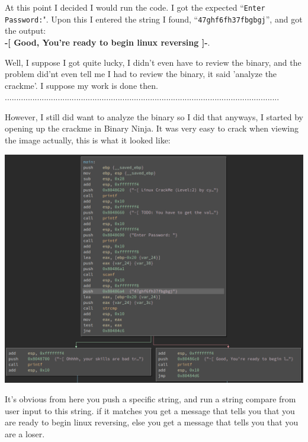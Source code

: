 \documentclass[12pt]{article}
\begin{document}
At this point I decided I would run the code. I got the expected ``\texttt{Enter Password:}". Upon this I entered the string I found,
``\texttt{47ghf6fh37fbgbgj}'', and got the output: \\ 
\textbf{-[ Good, You're ready to begin linux reversing ]-}.

Well, I suppose I got quite lucky, I didn't even have to review the binary, and the problem did'nt even tell me I had to review the
binary, it said 'analyze the crackme'. I suppose my work is done then. \\
.......................................................................................................................

However, I still did want to analyze the binary so I did that anyways, I started by opening up the crackme in Binary Ninja. It was very easy
to crack when viewing the image actually, this is what it looked like:

\begin{center}
	\includegraphics[scale=.5]{problem5.png}
\end{center}

It's obvious from here you push a specific string, and run a string compare from user input to this string. if it matches you get a message
that tells you that you are ready to begin linux reversing, else you get a message that tells you that you are a loser. 




\newpage

\end{document}
